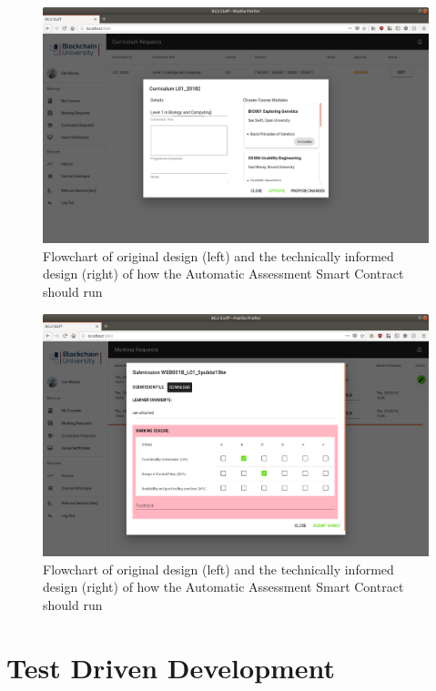\begin{figure}[!ht]
	\centering
	\includegraphics[width=1.0\textwidth]{Teacher_approvecurr}
	\caption[Teacher Application Curriculum Requests Page]
	{Flowchart of original design (left) and the technically informed design (right) of how the Automatic Assessment Smart Contract should run}
	\label{fig:Teacher_approvecurr}
\end{figure}

\begin{figure}[!ht]
	\centering
	\includegraphics[width=1.0\textwidth]{Teacher_marking}
	\caption[Teacher Application Marking Requests Page]
	{Flowchart of original design (left) and the technically informed design (right) of how the Automatic Assessment Smart Contract should run}
	\label{fig:Teacher_marking}
\end{figure}

\section{Test Driven Development}

